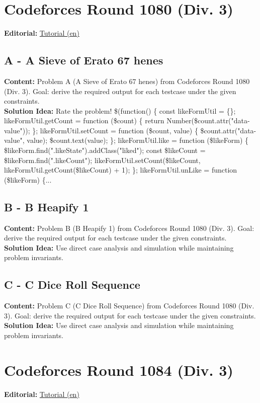 \documentclass[11pt]{article}
\begin{document}
\section{Codeforces Round 1080 (Div. 3)}
\textbf{Editorial:} \href{https://codeforces.com/blog/entry/151174}{Tutorial (en)}

\subsection{A - A Sieve of Erato 67 henes}
\textbf{Content:} Problem A (A Sieve of Erato 67 henes) from Codeforces Round 1080 (Div. 3). Goal: derive the required output for each testcase under the given constraints.\\
\textbf{Solution Idea:} Rate the problem! \$(function() \{ const likeFormUtil = \{\}; likeFormUtil.getCount = function (\$count) \{ return Number(\$count.attr("data-value")); \}; likeFormUtil.setCount = function (\$count, value) \{ \$count.attr("data-value", value); \$count.text(value); \}; likeFormUtil.like = function (\$likeForm) \{ \$likeForm.find(".likeState").addClass("liked"); const \$likeCount = \$likeForm.find(".likeCount"); likeFormUtil.setCount(\$likeCount, likeFormUtil.getCount(\$likeCount) + 1); \}; likeFormUtil.unLike = function (\$likeForm) \{...

\subsection{B - B Heapify 1}
\textbf{Content:} Problem B (B Heapify 1) from Codeforces Round 1080 (Div. 3). Goal: derive the required output for each testcase under the given constraints.\\
\textbf{Solution Idea:} Use direct case analysis and simulation while maintaining problem invariants.

\subsection{C - C Dice Roll Sequence}
\textbf{Content:} Problem C (C Dice Roll Sequence) from Codeforces Round 1080 (Div. 3). Goal: derive the required output for each testcase under the given constraints.\\
\textbf{Solution Idea:} Use direct case analysis and simulation while maintaining problem invariants.

\section{Codeforces Round 1084 (Div. 3)}
\textbf{Editorial:} \href{https://codeforces.com/blog/entry/151625}{Tutorial (en)}
\end{document}
